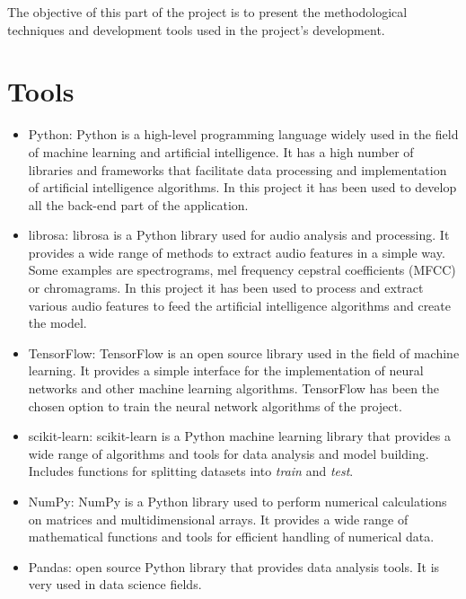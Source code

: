 
The objective of this part of the project is to present the methodological techniques and development tools used in the project's development.

\section{Tools}
\begin{itemize}
\item Python: Python is a high-level programming language widely used in the field of machine learning and artificial intelligence. It has a high number of libraries and frameworks that facilitate data processing and implementation of artificial intelligence algorithms.
In this project it has been used to develop all the back-end part of the application.

\item librosa: librosa is a Python library used for audio analysis and processing. It provides a wide range of methods to extract audio features in a simple way. Some examples are spectrograms, mel frequency cepstral coefficients (MFCC) or chromagrams.
In this project it has been used to process and extract various audio features to feed the artificial intelligence algorithms and create the model.

\item TensorFlow: TensorFlow is an open source library used in the field of machine learning. It provides a simple interface for the implementation of neural networks and other machine learning algorithms.
TensorFlow has been the chosen option to train the neural network algorithms of the project.

\item scikit-learn: scikit-learn is a Python machine learning library that provides a wide range of algorithms and tools for data analysis and model building. Includes functions for splitting datasets into \textit{train} and \textit{test}.

\item NumPy: NumPy is a Python library used to perform numerical calculations on matrices and multidimensional arrays. It provides a wide range of mathematical functions and tools for efficient handling of numerical data.

\item Pandas: open source Python library that provides data analysis tools. It is very used in data science fields.
\end{itemize}


